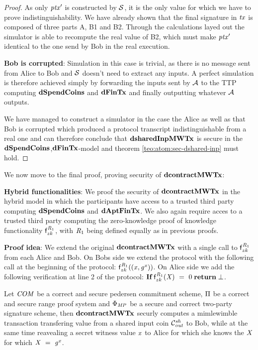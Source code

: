 \begin{proof}
    As only ${\mathit{ptx}}'$ is constructed by $\mathcal{S}$, it is the only value for which we have to prove indistinguishability.
    We have already shown that the final signature in $\mathit{tx}$ is composed of three parts A, B1 and B2.
    Through the calculations layed out the simulator is able to recompute the real value of B2, which must make ${\mathit{ptx}}'$ identical to the one send by Bob in the real execution.

    \textbf{Bob is corrupted}: Simulation in this case is trivial, as there is no message sent from Alice to Bob and $\mathcal{S}$ doesn't need to extract any inputs.
    A perfect simulation is therefore achieved simply by forwarding the inputs sent by $\mathcal{A}$ to the TTP computing $\mathbf{dSpendCoins}$ and $\mathbf{dFinTx}$ and finally outputting whatever $\mathcal{A}$ outputs.

    We have managed to construct a simulator in the case the Alice as well as that Bob is corrupted which produced a protocol transcript indistinguishable from a real one and can therefore conclude that $\mathbf{dsharedInpMWTx}$ is secure in the $\mathbf{dSpendCoins}$,$\mathbf{dFinTx}$-model and theorem \ref{teo:atom:sec-dshared-inp} must hold.
\end{proof}

We now move to the final proof, proving security of $\mathbf{dcontractMWTx}$:

\textbf{Hybrid functionalities}: We proof the security of $\mathbf{dcontractMWTx}$ in the hybrid model in which the participants have access to a trusted third party computing $\mathbf{dSpendCoins}$ and $\mathbf{dAptFinTx}$.
We also again require acces to a trusted third party computing the zero-knowledge proof of knowledge functionality $\mathsf{f}^{\mathit{R}_1}_{zk}$, with $\mathit{R}_1$ being defined equally as in previous proofs.

\textbf{Proof idea}: We extend the original $\mathbf{dcontractMWTx}$ with a single call to $\mathsf{f}^{\mathit{R}_1}_{zk}$ from each Alice and Bob.
On Bobs side we extend the protocol with the following call at the beginning of the protocol: $\mathsf{f}^{\mathit{R}_1}_{zk}((\mathit{x}, \mathit{g}^{\mathit{x}}))$.
On Alice side we add the following verification at line 2 of the protocol: $\textbf{If}\; \mathsf{f}^{\mathit{R}_1}_{zk}(\mathit{X}) ~=~ 0 \; \textbf{return}\; \bot$.

\begin{theorem} \label{teo:atom:sec-dcontract-mw}
    Let $\mathit{COM}$ be a correct and secure pedersen commitment scheme, $\Pi$ be a correct and secure range proof system and $\Phi_{\mathit{MP}}$ be a secure and correct two-party signature scheme, then $\mathbf{dcontractMWTx}$ securly computes a mimlewimble transaction transfering value from a shared input coin $\mathcal{C}_{\mathit{out}}^{\mathit{sh}}$ to Bob, while at the same time reavealing a secret witness value $\mathit{x}$ to Alice for which she knows the $\mathit{X}$ for which $\mathit{X} ~=~ \mathit{g}^{\mathit{x}}$.
\end{theorem}

